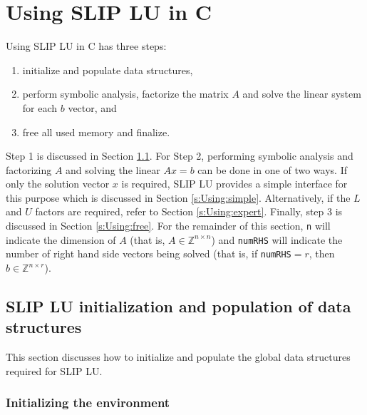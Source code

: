 \documentclass[12pt]{article}
\theoremstyle{definition}
\begin{document}
\cprotect\section{Using SLIP LU in C} \label{s:Using}

Using SLIP LU in C has three steps:

\begin{enumerate}
\item initialize and populate data structures,
\item perform symbolic analysis,
factorize the matrix $A$ and solve the linear
system for each $b$ vector, and
\item free all used memory and finalize.
\end{enumerate}

Step 1 is discussed in Section \ref{s:Using:init}.  For Step 2, performing
symbolic analysis and factorizing $A$ and solving the linear $A x =b$ can be
done in one of two ways. If only the solution vector $x$ is required, SLIP LU
provides a simple interface for this purpose which is discussed in Section
\ref{s:Using:simple}.  Alternatively, if the $L$ and $U$ factors are required,
refer to Section \ref{s:Using:expert}.  Finally, step 3 is discussed in Section
\ref{s:Using:free}. For the remainder of this section, \verb|n| will indicate
the dimension of $A$ (that is, $A \in \mathbb{Z}^{n \times n}$) and
\verb|numRHS| will indicate the number of right hand side vectors being solved
(that is, if \verb|numRHS|$= r$, then $b \in \mathbb{Z}^{n \times r}$).

\cprotect\subsection{SLIP LU initialization and population of data structures}
\label{s:Using:init}

This section discusses how to initialize and populate the global data
structures required for SLIP LU.

\subsubsection{Initializing the environment}
\end{document}
